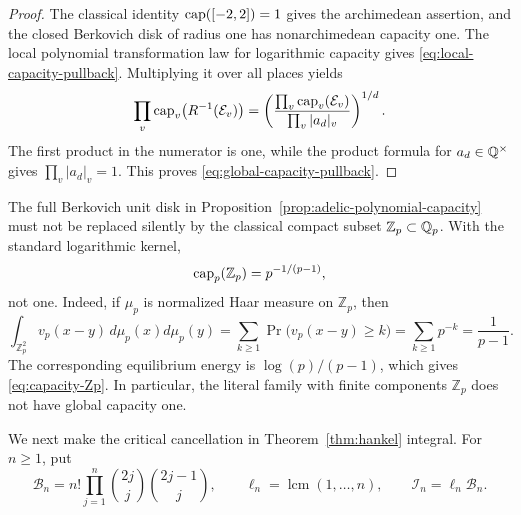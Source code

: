 \begin{proof}
The classical identity
\(\operatorname{cap}([-2,2])=1\) gives the archimedean assertion, and the closed
Berkovich disk of radius one has nonarchimedean capacity one.  The local
polynomial transformation law for logarithmic capacity gives
\eqref{eq:local-capacity-pullback}.  Multiplying it over all places yields
\[
 \prod_v\operatorname{cap}_v\bigl(R^{-1}(\mathcal E_v)\bigr)
 =
 \left(
   \frac{\prod_v\operatorname{cap}_v(\mathcal E_v)}
        {\prod_v|a_d|_v}
 \right)^{1/d}.
\]
The first product in the numerator is one, while the product formula for
\(a_d\in\mathbb Q^\times\) gives \(\prod_v|a_d|_v=1\).  This proves
\eqref{eq:global-capacity-pullback}.
\end{proof}

\begin{remark}
The full Berkovich unit disk in Proposition~\ref{prop:adelic-polynomial-capacity}
must not be replaced silently by the classical compact subset
\(\mathbb Z_p\subset\mathbb Q_p\).  With the standard logarithmic kernel,
\begin{equation}\label{eq:capacity-Zp}
 \operatorname{cap}_p(\mathbb Z_p)=p^{-1/(p-1)},
\end{equation}
not one.  Indeed, if \(\mu_p\) is normalized Haar measure on
\(\mathbb Z_p\), then
\[
 \int_{\mathbb Z_p^2}v_p(x-y)\,d\mu_p(x)d\mu_p(y)
 =\sum_{k\geq1}\Pr\bigl(v_p(x-y)\geq k\bigr)
 =\sum_{k\geq1}p^{-k}=\frac1{p-1}.
\]
The corresponding equilibrium energy is
\(\log(p)/(p-1)\), which gives \eqref{eq:capacity-Zp}.
In particular, the literal family with finite components \(\mathbb Z_p\)
does not have global capacity one.
\end{remark}

We next make the critical cancellation in
Theorem~\ref{thm:hankel} integral.  For \(n\geq1\), put
\begin{equation}\label{eq:hankel-integral-clearing}
 \mathcal B_n
 =n!\prod_{j=1}^n
   \binom{2j}{j}\binom{2j-1}{j},
 \qquad
 \ell_n=\operatorname{lcm}(1,\ldots,n),
 \qquad
 \mathcal I_n=\ell_n\mathcal B_n.
\end{equation}

